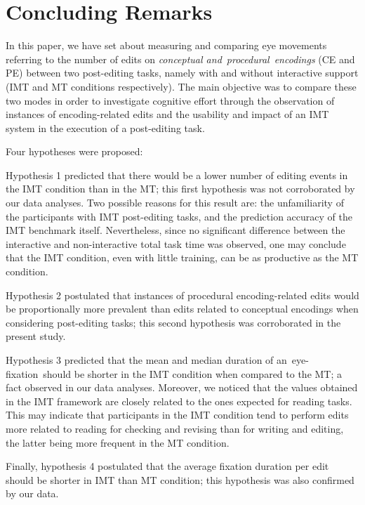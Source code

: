 \documentclass[output=paper]{langsci/langscibook}
\begin{document}
\section{Concluding Remarks}


In this paper, we have set about measuring and comparing eye movements referring to the number of edits on \emph{conceptual and}{~}\emph{procedural}{~}\emph{encodings }(CE and PE) between two post-editing tasks, namely with and without interactive support (IMT and MT conditions respectively). The main objective was to compare these two modes in order to investigate cognitive effort through the observation of instances of encoding-related edits and the usability and impact of an IMT system in the execution of a post-editing task. 



Four hypotheses were proposed: 



Hypothesis 1 predicted that there would be a lower number of editing events in the IMT condition than in the MT; this first hypothesis was not corroborated by our data analyses. Two possible reasons for this result are: the unfamiliarity of the participants with IMT post-editing tasks, and the prediction accuracy of the IMT benchmark itself. Nevertheless, since no significant difference between the interactive and non-interactive total task time was observed, one may conclude that the IMT condition, even with little training, can be as productive as the MT condition. 



Hypothesis 2 postulated that instances of procedural encoding-related edits would be proportionally more prevalent than edits related to conceptual encodings when considering post-editing tasks; this second hypothesis was corroborated in the present study. 



Hypothesis 3 predicted that the mean and median duration of an~eye-fixation~should be shorter in the IMT condition when compared to the MT; a fact observed in our data analyses. Moreover, we noticed that the values obtained in the IMT framework are closely related to the ones expected for reading tasks. This may indicate that participants in the IMT condition tend to perform edits more related to reading for checking and revising than for writing and editing, the latter being more frequent in the MT condition.~



Finally, hypothesis 4 postulated that the average fixation duration per edit should be shorter in IMT than MT condition; this hypothesis was also confirmed by our data. 
\end{document}
